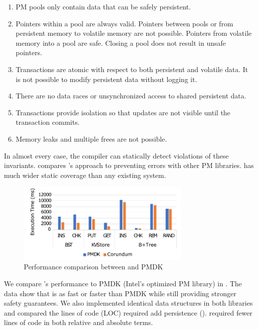 \documentclass[pageno]{jpaper}
\theoremstyle{invar}
\theoremstyle{goal}
\begin{document}
\begin{enumerate}

\item PM pools only contain data that can be safely persistent.
\item Pointers within a pool are always valid.  Pointers between pools or from
  persistent memory to volatile memory are not possible.  Pointers from
  volatile memory into a pool are safe.  Closing a pool does not result in
  unsafe pointers.
\item  Transactions are atomic with respect to both persistent and volatile data.
  It is not possible to modify persistent data without logging
  it.
\item There are no data races or unsynchronized access to shared persistent data. 
\item Transactions provide isolation so that updates are not visible until the transaction commits. 
\item Memory leaks and multiple frees are not possible. 
\end{enumerate}

In almost every case, the compiler can statically detect violations of these
invariants.   compares \this{}'s approach to preventing errors
with other PM libraries.  \This{} has much wider static coverage than any
existing system.

\begin{figure}%
  \begin{center}
  \includegraphics[width=3.3in]{Graphs/perf-ext.pdf}
  \end{center}
  \caption{\label{fig:perf} Performance comparison between \this{} and PMDK}
\end{figure}

We compare \this{}'s performance to PMDK (Intel's optimized PM library) in
.  The data show that \this{} is as fast or faster than PMDK
while still providing stronger safety guarantees.  We also implemented
identical data structures in both libraries and compared the lines of code (LOC) required
add persistence ().  \This{} required fewer lines of code in both relative and absolute terms.
\end{document}
